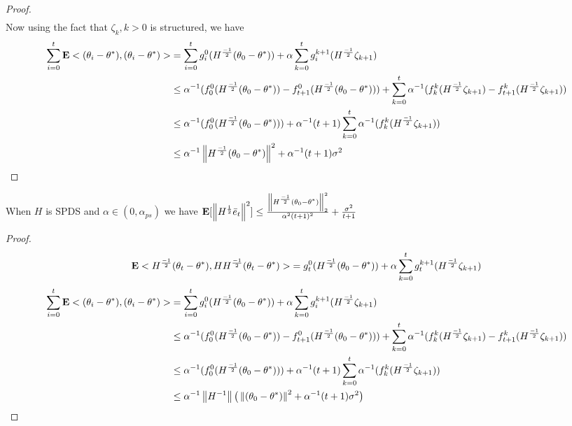 \begin{proof}
\begin{align*}
\end{align*}
Now using the fact that $\zeta_k, k>0$ is structured, we have
\begin{align*}
\sum_{i=0}^t\mathbf{E}<(\theta_i-\theta^*),(\theta_i-\theta^*)>&=\sum_{i=0}^t g^0_i( H^{\frac{-1}{2}}(\theta_0-\theta^*))+\alpha\sum_{k=0}^t g^{k+1}_i(H^{\frac{-1}{2}}\zeta_{k+1})\\
&\leq\alpha^{-1}(f^0_0(H^{\frac{-1}{2}}(\theta_0-\theta^*))-f^0_{t+1}(H^{\frac{-1}{2}}(\theta_0-\theta^*)))+\sum_{k=0}^t \alpha^{-1}(f^k_k(H^{\frac{-1}{2}}\zeta_{k+1})-f^k_{t+1}(H^{\frac{-1}{2}}\zeta_{k+1}))\\
&\leq\alpha^{-1}(f^0_0(H^{\frac{-1}{2}}(\theta_0-\theta^*)))+\alpha^{-1}(t+1)\sum_{k=0}^t \alpha^{-1}(f^k_k(H^{\frac{-1}{2}}\zeta_{k+1}))\\
&\leq\alpha^{-1}\left\| H^{\frac{-1}{2}}(\theta_0-\theta^*)\right\|^2+\alpha^{-1}(t+1)\sigma^2
\end{align*}
\end{proof}

\begin{theorem}\label{spdsmus}
When $H$ is SPDS and $\alpha\in (0,\alpha_{ps})$ we have $\mathbf{E}[\left\| H^{\frac{1}{2}}\bar{e}_t\right\|^2]\leq \frac{\left\| H^{\frac{-1}{2}}(\theta_0-\theta^*)\right\|^2_2}{\alpha^2(t+1)^2}+\frac{\sigma^2}{t+1}$
\end{theorem}
\begin{proof}
\begin{align*}
\mathbf{E}<H^{\frac{-1}{2}}(\theta_t-\theta^*),H H^{\frac{-1}{2}}(\theta_t-\theta^*)>&=g^0_t(H^{\frac{-1}{2}}(\theta_0-\theta^*))+\alpha\sum_{k=0}^t g^{k+1}_t(H^{\frac{-1}{2}}\zeta_{k+1})\\
\end{align*}
\begin{align*}
\sum_{i=0}^t\mathbf{E}<(\theta_i-\theta^*),(\theta_i-\theta^*)>&=\sum_{i=0}^t g^0_i( H^{\frac{-1}{2}}(\theta_0-\theta^*))+\alpha\sum_{k=0}^t g^{k+1}_i(H^{\frac{-1}{2}}\zeta_{k+1})\\
&\leq\alpha^{-1}(f^0_0(H^{\frac{-1}{2}}(\theta_0-\theta^*))-f^0_{t+1}(H^{\frac{-1}{2}}(\theta_0-\theta^*)))+\sum_{k=0}^t \alpha^{-1}(f^k_k(H^{\frac{-1}{2}}\zeta_{k+1})-f^k_{t+1}(H^{\frac{-1}{2}}\zeta_{k+1}))\\
&\leq\alpha^{-1}(f^0_0(H^{\frac{-1}{2}}(\theta_0-\theta^*)))+\alpha^{-1}(t+1)\sum_{k=0}^t \alpha^{-1}(f^k_k(H^{\frac{-1}{2}}\zeta_{k+1}))\\
&\leq\alpha^{-1}\left\| H^{-1}\right\|\big(\left\| (\theta_0-\theta^*)\right\|^2+\alpha^{-1}(t+1)\sigma^2\big)
\end{align*}
\end{proof}

